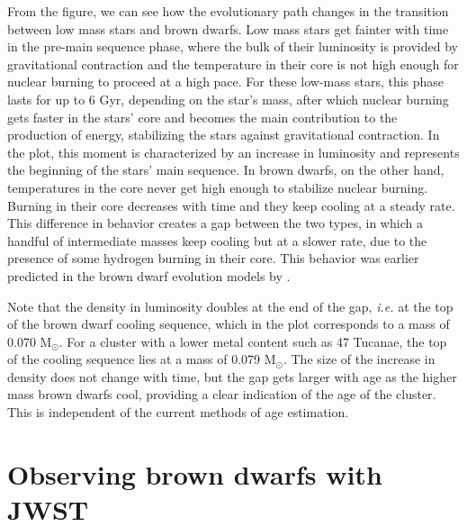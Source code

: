 \documentclass[useAMS,usenatbib]{mnras}
\begin{document}
From the figure, we can see how the evolutionary path changes in the transition between low mass stars and brown dwarfs. Low mass stars get fainter with time in the pre-main sequence phase, where the bulk of their luminosity is provided by gravitational contraction and the temperature in their core is not high enough for nuclear burning to proceed at a high pace. For these low-mass stars, this phase lasts for up to 6 Gyr, depending on the star's mass, after which nuclear burning gets faster in the stars' core and becomes the main contribution to the production of energy, stabilizing the stars against gravitational contraction. In the plot, this moment is characterized by an increase in luminosity and represents the beginning of the stars' main sequence.  In brown dwarfs, on the other hand, temperatures in the core never get high enough to stabilize nuclear burning. Burning in their core decreases with time and they keep cooling at a steady rate. This difference in behavior creates a gap between the two types, in which a handful of intermediate masses keep cooling but at a slower rate, due to the presence of some hydrogen burning in their core. This behavior was earlier predicted in the brown dwarf evolution models by \citet{1989ApJ...345..939B}.

Note that the density in luminosity doubles at the end of the gap, {\em i.e.} at the top of the brown dwarf cooling sequence, which in the plot corresponds to a mass of 0.070 M$_\odot$.  For a cluster with a lower metal content such as 47 Tucanae, the top of the cooling sequence lies at a mass of 0.079 M$_\odot$. The size of the increase in density does not change with time, but the gap gets larger with age as the higher mass brown dwarfs cool, providing a clear indication of the age of the cluster.  This is independent of the current methods of age estimation.

\section{Observing brown dwarfs with JWST}
\label{sec:JWST}
\end{document}
